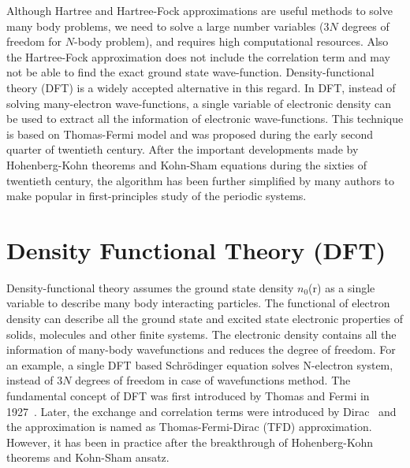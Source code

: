 Although Hartree and Hartree-Fock approximations are useful methods to solve many body problems, we need to solve a large number variables ($3N$ degrees of freedom for $N$-body problem), and requires high computational resources. Also the Hartree-Fock approximation does not include the correlation term and may not be able to find the exact ground state wave-function. Density-functional theory (DFT) is a widely accepted alternative in this regard. In DFT, instead of solving many-electron wave-functions, a single variable of electronic density can be used to extract all the information of electronic wave-functions. This technique is based on Thomas-Fermi model and was proposed during the early second quarter of twentieth century. After the important developments made by Hohenberg-Kohn theorems and Kohn-Sham equations during the sixties of twentieth century, the algorithm has been further simplified by many authors to make popular in first-principles study of the periodic systems. 
\section{Density Functional Theory (DFT)}
Density-functional theory assumes the ground state density $n_0$(r) as a single variable to describe many body interacting particles. The functional of electron density can describe all the ground state and excited state electronic properties of solids, molecules and other finite systems. The electronic density contains all the information of many-body wavefunctions and reduces the degree of freedom. For an example, a single DFT based Schr\"odinger equation solves N-electron system, instead of $3N$ degrees of freedom in case of wavefunctions method. The fundamental concept of DFT was first introduced by Thomas and Fermi in 1927~\citep{Thomas1927, Fermi1927}. Later, the exchange and correlation terms were introduced by Dirac~\citep{Dirac1930} and the approximation is named as Thomas-Fermi-Dirac (TFD) approximation. However, it has been in practice after the breakthrough of Hohenberg-Kohn theorems and Kohn-Sham ansatz.
